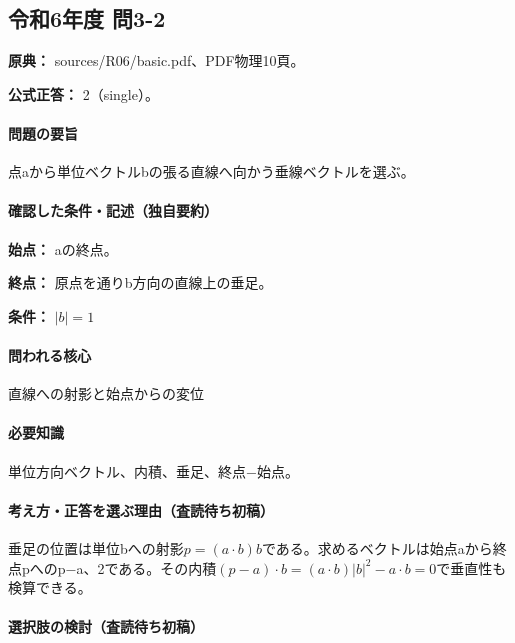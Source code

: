 \subsection{令和6年度 問3-2}
\label{q:r06-reg-basic-3-2}

\noindent\textbf{原典：} sources/R06/basic.pdf、PDF物理10頁。

\textbf{公式正答：} 2（single）。

\paragraph{問題の要旨} 点aから単位ベクトルbの張る直線へ向かう垂線ベクトルを選ぶ。

\paragraph{確認した条件・記述（独自要約）}\mbox{}\par

\noindent\textbf{始点：} aの終点。\par

\noindent\textbf{終点：} 原点を通りb方向の直線上の垂足。\par

\noindent\textbf{条件：} \(|b|=1\)\par

\paragraph{問われる核心} 直線への射影と始点からの変位

\paragraph{必要知識} 単位方向ベクトル、内積、垂足、終点−始点。

\paragraph{考え方・正答を選ぶ理由（査読待ち初稿）} 垂足の位置は単位bへの射影\(p=(a\cdot b)b\)である。求めるベクトルは始点aから終点pへのp−a、2である。その内積\((p-a)\cdot b=(a\cdot b)|b|^2-a\cdot b=0\)で垂直性も検算できる。

\paragraph{選択肢の検討（査読待ち初稿）}\mbox{}\par

